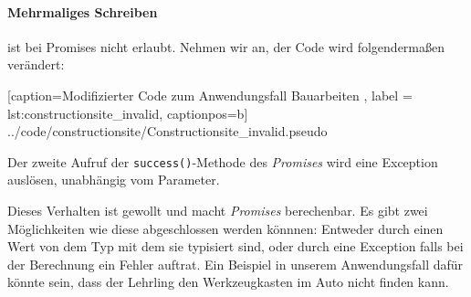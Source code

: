 \paragraph{Mehrmaliges Schreiben} ist bei Promises nicht erlaubt.
Nehmen wir an, der Code wird folgendermaßen verändert:


    [caption={Modifizierter Code zum Anwendungsfall \glqq Bauarbeiten\grqq{} },
       label = lst:constructionsite_invalid,
       captionpos=b]
 {../code/constructionsite/Constructionsite_invalid.pseudo}
 
Der zweite Aufruf der \texttt{success()}-Methode des \emph{Promises}
wird eine Exception auslösen, unabhängig vom Parameter.

Dieses Verhalten ist gewollt und macht \emph{Promises} berechenbar.
Es gibt zwei Möglichkeiten wie diese abgeschlossen werden könnnen:
Entweder durch einen Wert von dem Typ mit dem sie typisiert sind,
oder durch eine Exception falls bei der Berechnung ein Fehler auftrat.
Ein Beispiel in unserem Anwendungsfall dafür könnte sein, dass der
Lehrling den Werkzeugkasten im Auto nicht finden kann.
